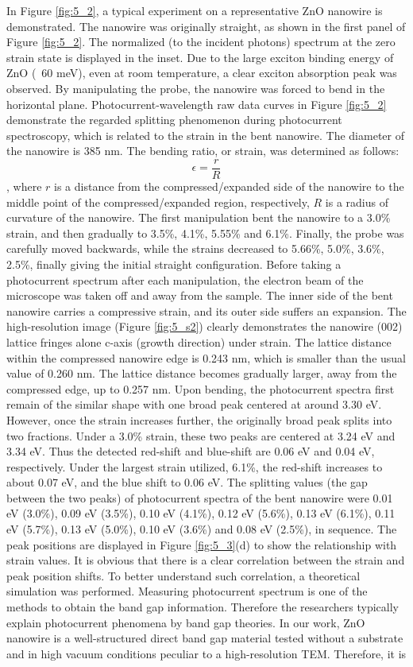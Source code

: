 In Figure \ref{fig:5_2}, a typical experiment on a representative ZnO nanowire is demonstrated. The nanowire was originally straight, as shown in the first panel of Figure \ref{fig:5_2}. The normalized (to the incident photons) spectrum at the zero strain state is displayed in the inset. Due to the large exciton binding energy of ZnO (~60 meV), even at room temperature, a clear exciton absorption peak was observed. By manipulating the probe, the nanowire was forced to bend in the horizontal plane. Photocurrent-wavelength raw data curves in Figure \ref{fig:5_2} demonstrate the regarded splitting phenomenon during photocurrent spectroscopy, which is related to the strain in the bent nanowire. The diameter of the nanowire is 385 nm. The bending ratio, or strain, was determined as follows: $$\epsilon = \frac{r}{R} $$
, where $r$ is a distance from the compressed/expanded side of the nanowire to the middle point of the compressed/expanded region, respectively, $R$ is a radius of curvature of the nanowire. The first manipulation bent the nanowire to a 3.0\% strain, and then gradually to 3.5\%, 4.1\%, 5.55\% and 6.1\%. Finally, the probe was carefully moved backwards, while the strains decreased to 5.66\%, 5.0\%, 3.6\%, 2.5\%, finally giving the initial straight configuration. Before taking a photocurrent spectrum after each manipulation, the electron beam of the microscope was taken off and away from the sample. The inner side of the bent nanowire carries a compressive strain, and its outer side suffers an expansion. The high-resolution image (Figure \ref{fig:5_s2}) clearly demonstrates the nanowire (002) lattice fringes alone c-axis (growth direction) under strain.\cite{zhang2015opto} The lattice distance within the compressed nanowire edge is 0.243 nm, which is smaller than the usual value of 0.260 nm.\cite{L.2011} The lattice distance becomes gradually larger, away from the compressed edge, up to 0.257 nm. Upon bending, the photocurrent spectra first remain of the similar shape with one broad peak centered at around 3.30 eV. However, once the strain increases further, the originally broad peak splits into two fractions. Under a 3.0\% strain, these two peaks are centered at 3.24 eV and 3.34 eV. Thus the detected red-shift and blue-shift are 0.06 eV and 0.04 eV, respectively. Under the largest strain utilized, 6.1\%, the red-shift increases to about 0.07 eV, and the blue shift to 0.06 eV. The splitting values (the gap between the two peaks) of photocurrent spectra of the bent nanowire were 0.01 eV (3.0\%), 0.09 eV (3.5\%), 0.10 eV (4.1\%), 0.12 eV (5.6\%), 0.13 eV (6.1\%), 0.11 eV (5.7\%), 0.13 eV (5.0\%), 0.10 eV (3.6\%) and 0.08 eV (2.5\%), in sequence. The peak positions are displayed in Figure \ref{fig:5_3}(d) to show the relationship with strain values. It is obvious that there is a clear correlation between the strain and peak position shifts. To better understand such correlation, a theoretical simulation was performed. Measuring photocurrent spectrum is one of the methods to obtain the band gap information. Therefore the researchers typically explain photocurrent phenomena by band gap theories. In our work, ZnO nanowire is a well-structured direct band gap material tested without a substrate and in high vacuum conditions peculiar to a high-resolution TEM. Therefore, it is 
